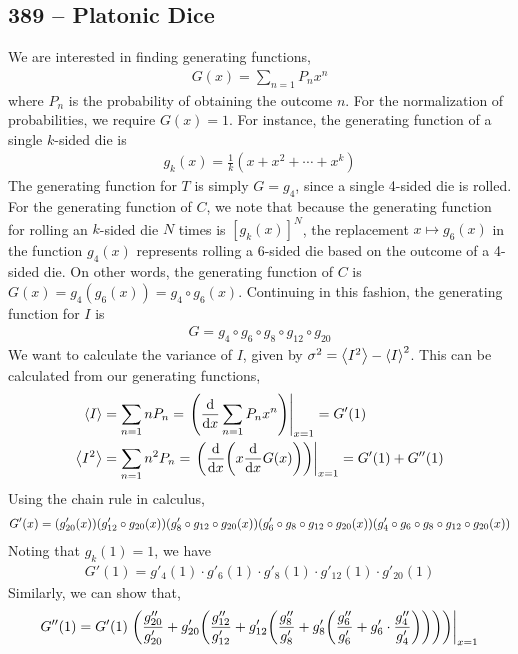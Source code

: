 \documentclass{article}
\begin{document}
\subsection*{389 -- Platonic Dice}
We are interested in finding generating functions,
\begin{align*}
	G(x) = \sum_{n=1} P_n x^n
\end{align*}
where $P_n$ is the probability of obtaining the outcome $n$.
For the normalization of probabilities, we require $G(x) = 1$.
For instance, the generating function of a single $k$-sided die is
\begin{align*}
	g_k(x) = \frac{1}{k}(x + x^2 + \cdots + x^k)
\end{align*}
The generating function for $T$ is simply $G = g_4$, since a single 4-sided die is rolled.
For the generating function of $C$, we note that because the generating function for rolling an $k$-sided die $N$ times is $[g_k(x)]^N$, the replacement $x \mapsto g_6(x)$ in the function $g_4(x)$ represents rolling a 6-sided die based on the outcome of a 4-sided die.
On other words, the generating function of $C$ is $G(x) = g_4(g_6(x)) = g_4 \circ g_6(x)$.
Continuing in this fashion, the generating function for $I$ is
\begin{align*}
	G = g_4 \circ g_6 \circ g_8 \circ g_{12} \circ g_{20}
\end{align*}
We want to calculate the variance of $I$, given by $\sigma^2 = \ev{I^2} - \ev{I}^2$.
This can be calculated from our generating functions,
\begin{align*}
	\ev{I} &= \sum_{n=1} n P_n = \eval{\qty( \dv{x} \sum_{n=1} P_n x^n)}_{x=1} = G'(1) \\
	\ev{I^2} &= \sum_{n=1} n^2 P_n = \eval{\qty(\dv{x} \qty( x \dv{x} G(x) ))}_{x=1} = G'(1) + G''(1)
\end{align*}
Using the chain rule in calculus,
\begin{align*}
	G'(x) = \qty( g'_{20}(x)) \qty( g'_{12} \circ g_{20}(x))\qty( g'_8 \circ g_{12} \circ g_{20}(x)) \qty( g'_6 \circ g_8 \circ g_{12} \circ g_{20}(x))\qty( g'_4 \circ g_6 \circ g_8 \circ g_{12} \circ g_{20}(x) )
\end{align*}
Noting that $g_k(1) = 1$, we have
\begin{align*}
	G'(1) = g'_4(1) \cdot g'_6(1) \cdot g'_8(1) \cdot g'_{12}(1) \cdot g'_{20}(1)
\end{align*}
Similarly, we can show that,
\begin{align*}
	G''(1) = G'(1) \eval{\qty( \frac{g''_{20}}{g'_{20}} + g'_{20} \qty(\frac{g''_{12}}{g'_{12}} + g'_{12} \qty(\frac{g''_8}{g'_8} + g'_8 \qty(\frac{g''_6}{g'_6} + g'_6 \cdot \frac{g''_4}{g'_4}))))}_{x=1}
\end{align*}
\end{document}

